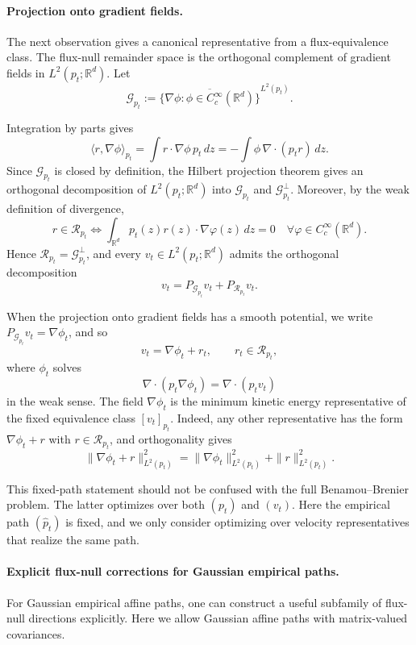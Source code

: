 \documentclass[a4paper,11pt]{article}
\newcommand{\R}{\mathbb{R}}
\theoremstyle{plain}
\theoremstyle{definition}
\begin{document}
\paragraph{Projection onto gradient fields.}
The next observation gives a canonical
representative from a flux-equivalence class. The flux-null remainder space is the orthogonal complement of gradient fields in \(L^2(p_t;\R^d)\). Let
\[
    \mathcal G_{p_t}
    :=
    \overline{\{\nabla\phi:\phi\in C_c^\infty(\R^d)\}}^{L^2(p_t)}.
\]

Integration by parts gives
\[
    \langle r,\nabla\phi\rangle_{p_t}
    =
    \int r\cdot\nabla\phi\,p_t\,dz
    =
    -\int \phi\,\nabla\cdot(p_t r)\,dz.
\]
Since \(\mathcal G_{p_t}\) is closed by definition, the Hilbert projection theorem gives an orthogonal decomposition of \(L^2(p_t;\mathbb R^d)\) into \(\mathcal G_{p_t}\) and \(\mathcal G_{p_t}^{\perp}\). 
Moreover, by the weak
definition of divergence,
\[
    r\in\mathcal R_{p_t}
    \iff
    \int_{\mathbb R^d} p_t(z)r(z)\cdot\nabla\varphi(z)\,dz=0
    \quad
    \forall \varphi\in C_c^\infty(\mathbb R^d).
\]
Hence \(\mathcal R_{p_t}=\mathcal G_{p_t}^{\perp}\), and every
\(v_t\in L^2(p_t;\mathbb R^d)\) admits the orthogonal decomposition
\[
    v_t=P_{\mathcal G_{p_t}}v_t+P_{\mathcal R_{p_t}}v_t.
\]

When the projection onto gradient fields has a smooth potential, we write \(P_{\mathcal G_{p_t}}v_t=\nabla\phi_t\), and so
\[
    v_t=\nabla\phi_t+r_t,
    \qquad r_t\in\mathcal R_{p_t},
\]
where \(\phi_t\) solves
\[
    \nabla\cdot(p_t\nabla\phi_t)=\nabla\cdot(p_t v_t)
\]
in the weak sense. The field \(\nabla\phi_t\) is the minimum kinetic energy representative of the fixed equivalence class \([v_t]_{p_t}\). Indeed, any other representative has the form \(\nabla\phi_t+r\) with \(r\in\mathcal R_{p_t}\), and orthogonality gives
\[
    \|\nabla\phi_t+r\|_{L^2(p_t)}^2
    =\|\nabla\phi_t\|_{L^2(p_t)}^2+\|r\|_{L^2(p_t)}^2.
\]

This fixed-path statement should not be confused with the full Benamou--Brenier problem. The latter optimizes over both \((p_t)\) and \((v_t)\). Here the empirical path \((\hat p_t)\) is fixed, and we only consider optimizing over velocity representatives that realize the same path.

\paragraph{Explicit flux-null corrections for Gaussian empirical paths.}
For Gaussian empirical affine paths,  one can construct a useful
subfamily of flux-null directions explicitly. Here we allow Gaussian affine paths with matrix-valued covariances.
\end{document}
